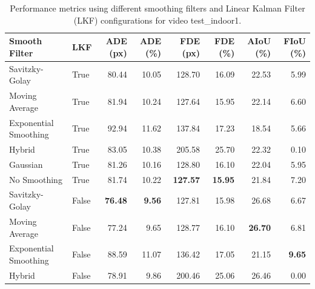 \documentclass[12pt,oneside]{book} %
\begin{document}
\begin{table}[H]
    \centering
    \caption{Performance metrics using different smoothing filters and Linear Kalman Filter (LKF) configurations for video test\_indoor1.}
    \begin{adjustbox}{max width=\textwidth}
        \begin{tabular}{llrrrrrr}
            \toprule
            \textbf{Smooth Filter} & \textbf{LKF} & \textbf{ADE (px)} & \textbf{ADE (\%)} & \textbf{FDE (px)} & \textbf{FDE (\%)} & \textbf{AIoU (\%)} & \textbf{FIoU (\%)} \\
            \midrule
            Savitzky-Golay         & True         & 80.44             & 10.05             & 128.70            & 16.09             & 22.53              & 5.99               \\
            Moving Average         & True         & 81.94             & 10.24             & 127.64            & 15.95             & 22.14              & 6.60               \\
            Exponential Smoothing  & True         & 92.94             & 11.62             & 137.84            & 17.23             & 18.54              & 5.66               \\
            Hybrid                 & True         & 83.05             & 10.38             & 205.58            & 25.70             & 22.32              & 0.10               \\
            Gaussian               & True         & 81.26             & 10.16             & 128.80            & 16.10             & 22.04              & 5.95               \\
            No Smoothing           & True         & 81.74             & 10.22             & \textbf{127.57}   & \textbf{15.95}    & 21.84              & 7.20               \\
            Savitzky-Golay         & False        & \textbf{76.48}    & \textbf{9.56}     & 127.81            & 15.98             & 26.68              & 6.67               \\
            Moving Average         & False        & 77.24             & 9.65              & 128.77            & 16.10             & \textbf{26.70}     & 6.81               \\
            Exponential Smoothing  & False        & 88.59             & 11.07             & 136.42            & 17.05             & 21.15              & \textbf{9.65}      \\
            Hybrid                 & False        & 78.91             & 9.86              & 200.46            & 25.06             & 26.46              & 0.00               \\

\end{tabular}
\end{adjustbox}
\end{table}
\end{document}
